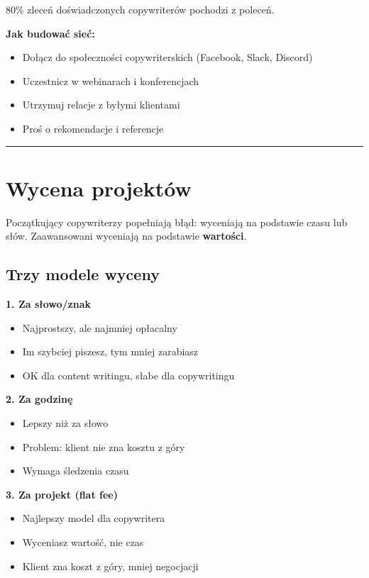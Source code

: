 \documentclass[
  12pt,
  a4paper,
  twoside,
  openright,
  12pt,
  DIV=12,
  BCOR=12mm]{scrbook}
\providecommand{\tightlist}{%
  \setlength{\itemsep}{0pt}\setlength{\parskip}{0pt}}\usepackage{longtable,booktabs,array}
\newcommand{\decoline}{%
  \begin{center}
    \textcolor{bordergray}{\rule{0.3\textwidth}{0.5pt}}
  \end{center}
}
\begin{document}
80\% zleceń doświadczonych copywriterów pochodzi z poleceń.

\textbf{Jak budować sieć:}

\begin{itemize}
\tightlist
\item
  Dołącz do społeczności copywriterskich (Facebook, Slack, Discord)
\item
  Uczestnicz w webinarach i konferencjach
\item
  Utrzymuj relacje z byłymi klientami
\item
  Proś o rekomendacje i referencje
\end{itemize}

\decoline

\section{Wycena projektów}\label{wycena-projektuxf3w}

Początkujący copywriterzy popełniają błąd: wyceniają na podstawie czasu
lub słów. Zaawansowani wyceniają na podstawie \textbf{wartości}.

\subsection{Trzy modele wyceny}\label{trzy-modele-wyceny}

\textbf{1. Za słowo/znak}

\begin{itemize}
\tightlist
\item
  Najprostszy, ale najmniej opłacalny
\item
  Im szybciej piszesz, tym mniej zarabiasz
\item
  OK dla content writingu, słabe dla copywritingu
\end{itemize}

\textbf{2. Za godzinę}

\begin{itemize}
\tightlist
\item
  Lepszy niż za słowo
\item
  Problem: klient nie zna kosztu z góry
\item
  Wymaga śledzenia czasu
\end{itemize}

\textbf{3. Za projekt (flat fee)}

\begin{itemize}
\tightlist
\item
  Najlepszy model dla copywritera
\item
  Wyceniasz wartość, nie czas
\item
  Klient zna koszt z góry, mniej negocjacji
\end{itemize}
\end{document}
